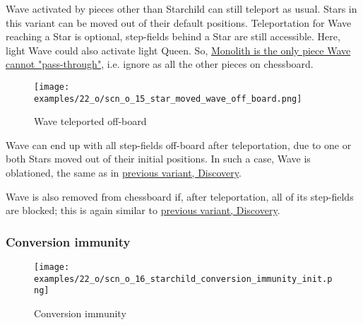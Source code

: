 \vspace*{-0.3\baselineskip}
Wave activated by pieces other than Starchild can still teleport as usual. Stars in this variant
can be moved out of their default positions. Teleportation for Wave reaching a Star is optional,
step-fields behind a Star are still accessible. Here, light Wave could also activate light Queen. So,
\hyperref[fig:scn_d_09_teleport_wave_via_monolith]{Monolith is the only piece Wave cannot "pass-through"},
i.e. ignore as all the other pieces on chessboard.

\clearpage %

\vspace*{-2.1\baselineskip}
\noindent
\begin{figure}[!h]
\texttt{[image: examples/22\_o/scn\_o\_15\_star\_moved\_wave\_off\_board.png]}
\caption{Wave teleported off-board}
\label{fig:scn_o_15_star_moved_wave_off_board}
\end{figure}

Wave can end up with all step-fields off-board after teleportation, due to one or both Stars
moved out of their initial positions. In such a case, Wave is oblationed, the same as in
\hyperref[fig:scn_d_11_wave_teleported_off_board]{previous variant, Discovery}.

Wave is also removed from chessboard if, after teleportation, all of its step-fields are
blocked; this is again similar to
\hyperref[fig:scn_d_10_teleported_wave_blocked]{previous variant, Discovery}.

\clearpage %

\subsubsection*{Conversion immunity}

\vspace*{-0.9\baselineskip}
\noindent
\begin{figure}[!h]
\texttt{[image: examples/22\_o/scn\_o\_16\_starchild\_conversion\_immunity\_init.png]}
\caption{Conversion immunity}
\label{fig:scn_o_16_starchild_conversion_immunity_init}
\end{figure}

